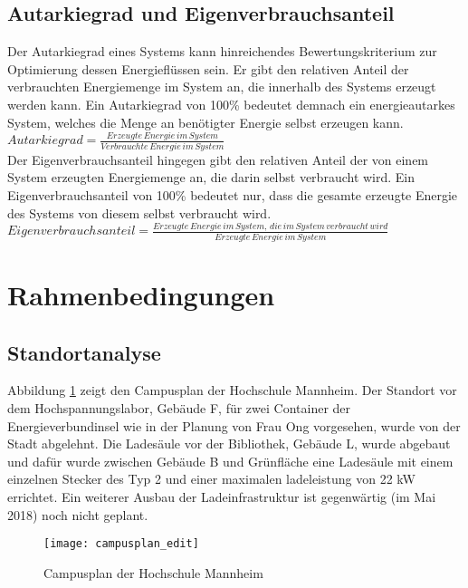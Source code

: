 						
				
		\subsection{Autarkiegrad und Eigenverbrauchsanteil}
			Der Autarkiegrad eines Systems kann hinreichendes Bewertungskriterium zur Optimierung dessen Energieflüssen sein. Er gibt den relativen Anteil der verbrauchten Energiemenge im System an, die innerhalb des Systems erzeugt werden kann. Ein Autarkiegrad von 100\% bedeutet demnach ein energieautarkes System, welches die Menge an benötigter Energie selbst erzeugen kann.\\
			
			$Autarkiegrad = \frac{Erzeugte\, Energie\, im\, System}{Verbrauchte \,Energie\, im\, System}$ \\
			
			Der Eigenverbrauchsanteil hingegen gibt den relativen Anteil der von einem System erzeugten Energiemenge an, die darin selbst verbraucht wird. Ein Eigenverbrauchsanteil von 100\% bedeutet nur, dass die gesamte erzeugte Energie des Systems von diesem selbst verbraucht wird. \\
			
			$Eigenverbrauchsanteil = \frac{Erzeugte\, Energie\, im\, System,\, die\, im\, System\, verbraucht\, wird}{Erzeugte\, Energie\, im\, System}$
			
			

						
\section{Rahmenbedingungen}
	\label{Kap:Rahmenbedingungen}
	\subsection{Standortanalyse}
	Abbildung \ref{Abb:Campusplan} zeigt den Campusplan der Hochschule Mannheim. Der Standort vor dem Hochspannungslabor, Gebäude F, für zwei Container der Energieverbundinsel wie in der Planung von Frau Ong vorgesehen, wurde von der Stadt abgelehnt. \cite{BA_Chris_Ong_2017} Die Ladesäule vor der Bibliothek, Gebäude L, wurde abgebaut und dafür wurde zwischen Gebäude B und Grünfläche eine Ladesäule mit einem einzelnen Stecker des Typ 2 und einer maximalen ladeleistung von 22 kW errichtet. Ein weiterer Ausbau der Ladeinfrastruktur ist gegenwärtig (im Mai 2018) noch nicht geplant.
    
		\begin{figure}[h]
			\centering
			\texttt{[image: campusplan\_edit]}
			\caption{Campusplan der Hochschule Mannheim \cite{HS_Campusplan}}
			\label{Abb:Campusplan}
		\end{figure}			

